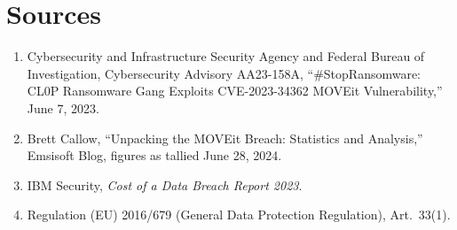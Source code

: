 \section*{Sources}
\begin{enumerate}[label=\lbrack\arabic*\rbrack, leftmargin=2.2em]
\item {}Cybersecurity and Infrastructure Security Agency and Federal Bureau of Investigation,
Cybersecurity Advisory AA23-158A, ``\#StopRansomware: CL0P Ransomware Gang Exploits CVE-2023-34362
MOVEit Vulnerability,'' June 7, 2023.
\item {}Brett Callow, ``Unpacking the MOVEit Breach: Statistics and Analysis,'' Emsisoft Blog,
figures as tallied June 28, 2024.
\item {}IBM Security, \emph{Cost of a Data Breach Report 2023}.
\item {}Regulation (EU) 2016/679 (General Data Protection Regulation), Art.\ 33(1).
\end{enumerate}
